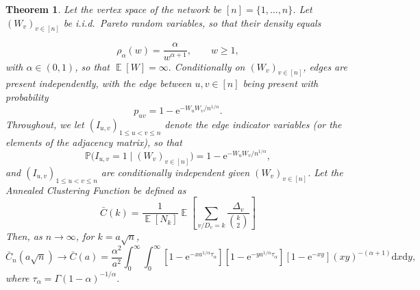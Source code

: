 \documentclass[ twocolumn,
 amsmath,amssymb,
 aps, pre, amsthm, amsfonts,
]{revtex4-2}
\newtheorem{theorem}{Theorem}
\DeclareMathOperator{\EX}{\mathbb{E}}%
\newcommand{\e}{\mathrm{e}}
\newcommand{\prob}{\mathbb{P}}
\begin{document}
\begin{theorem}
Let the vertex space of the network be $[n]=\{1, \ldots, n\}$. 
Let $(W_v)_{v\in[n]}$ be i.i.d.\ Pareto random variables, so that their density equals

\begin{equation}
\label{density-Pareto}
    \rho_\alpha(w)=\frac{\alpha}{w^{\alpha+1}}, \qquad w\geq 1,
\end{equation}
with $\alpha\in(0,1)$, so that $\EX[W]=\infty.$ Conditionally on $(W_v)_{v\in[n]}$, edges are present independently, with the edge between $u,v\in [n]$ being present with probability
\begin{equation}
    p_{uv}=1-\e^{-W_u W_v/n^{1/\alpha}}.
\end{equation}
Throughout, we let $(I_{u,v})_{1\leq u<v\leq n}$ denote the edge indicator variables (or the elements of the adjacency matrix), so that
\begin{equation}
    \prob\big(I_{u,v}=1\mid (W_v)_{v\in[n]}\big)=1-\e^{-W_uW_v/n^{1/\alpha}},
\end{equation}
and $(I_{u,v})_{1\leq u<v\leq n}$ are conditionally independent given $(W_v)_{v\in[n]}$. Let the Annealed Clustering Function be defined as
\begin{equation}
    \bar{C}(k) = \frac{1}{\EX\left[N_k\right]} \EX \left[ \sum_{v/D_v = k} \frac{\Delta_v}{\binom{k}{2}} \right] \label{eq:CC_annealed_app}
\end{equation}
Then, as $n\to\infty$, for $k = a \sqrt{n}$,
\begin{equation}
    \bar{C}_n(a\sqrt{n})\to \bar{C}(a)=\frac{\alpha^2}{a^2} \int_{0}^{\infty} \int_{0}^{\infty}[1-\e^{-xa^{1/\alpha} {\tau_\alpha}}][1-\e^{-ya^{1/\alpha} {\tau_\alpha}}][1-\e^{-xy}](xy)^{-(\alpha+1)}
	{\mathrm d}x {\mathrm d}y, \label{eq:analytical_clustering_app}
\end{equation}
where ${\tau_\alpha} = \Gamma(1-\alpha)^{-1/\alpha}$.
\end{theorem}
\end{document}
